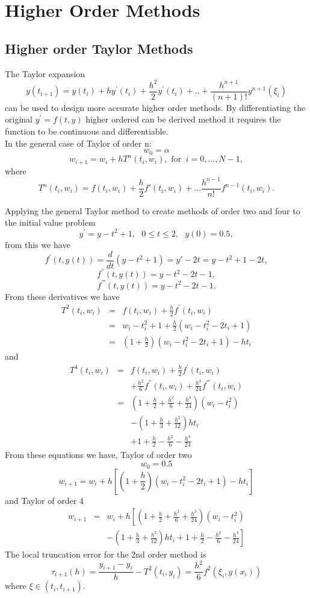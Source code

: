 \chapter{Higher Order Methods}
\section{Higher order Taylor Methods}
The Taylor expansion
\[ y(t_{i+1})=y(t_i)+h y^{'}(t_i)+\frac{h^2}{2}y^{'}(t_i)+..+\frac{h^{n+1}}{(n+1)!}y^{n+1}(\xi_i) \]
can be used to design more accurate higher order methods. 
By differentiating the original  $y^{'}=f(t,y)$  higher ordered can be derived 
method it requires the function to be continuous and differentiable.\\
In the general case of Taylor of order n:
\[ w_0=\alpha \]
\[ w_{i+1} = w_i + hT^n(t_i,w_i), \mbox{   for   } \ i=0,...,N-1, \]
where
\begin{equation} T^{n}(t_i,w_i) = f(t_i,w_i)+\frac{h}{2}f'(t_i,w_i)+...\frac{h^{n-1}}{n!}f^{n-1}(t_i,w_i). \end{equation}
\begin{example}
Applying the general Taylor method to create methods of order two and four to
the initial value problem
\[y^{'}=y-t^2+1, \ \ \ 0\leq t \leq 2, \ \ \ y(0)=0.5, \]
from this we have 
\[ f^{'}(t,y(t)) = \frac{d}{dt}(y-t^2+1) = y'-2t=y-t^2+1-2t, \]
\[ f^{''}(t,y(t)) = y-t^2-2t-1, \]
\[ f^{'''}(t,y(t)) = y-t^2-2t-1. \]
From these derivatives we have
\begin{eqnarray*}
T^{2}(t_i,w_i)&=&f(t_i,w_i)+\frac{h}{2}f^{'}(t_i,w_i)\\
&=&w_i-t_i^2+1+\frac{h}{2}(w_i-t_i^2-2t_i+1)\\
&=&\left(1+\frac{h}{2}\right)(w_i-t_i^2-2t_i+1)-ht_i
\end{eqnarray*}
and
\begin{eqnarray*}
T^{4}(t_i,w_i)&=&f(t_i,w_i)+\frac{h}{2}f^{'}(t_i,w_i)\\
& &+\frac{h^2}{6}f^{''}(t_i,w_i)+\frac{h^3}{24}f^{'''}(t_i,w_i)\\
&=&\left(1+\frac{h}{2}+\frac{h^2}{6}+\frac{h^3}{24}\right)(w_i-t_i^2)\\
& &-\left(1+\frac{h}{3}+\frac{h^2}{12}\right)ht_i\\
& & +1+\frac{h}{2}-\frac{h^2}{6}-\frac{h^3}{24}
\end{eqnarray*}
From these equations we have,
Taylor of order two
\[w_0=0.5\]
\[w_{i+1}=w_i+h\left[\left(1+\frac{h}{2}\right)(w_i-t_i^2-2t_i+1)-ht_i
\right] \]
and Taylor of order 4
\begin{eqnarray*}w_{i+1}&=&w_i+h\left[\left(1+\frac{h}{2}+\frac{h^2}{6}+\frac{h^3}{24}\right)(w_i-t_i^2)\right.\\
& &\left.-\left(1+\frac{h}{3}+\frac{h^2}{12}\right)ht_i
 +1+\frac{h}{2}-\frac{h^2}{6}-\frac{h^3}{24}
\right] \end{eqnarray*}
The local truncation error for the 2nd order method is 
\[\tau_{i+1}(h) = \frac{y_{i+1}-y_i}{h} -T^2(t_i,y_i) = \frac{h^2}{6}f^2(\xi_i,y(x_i))\]
where $\xi \in (t_i,t_{i+1})$.
\end{example}
